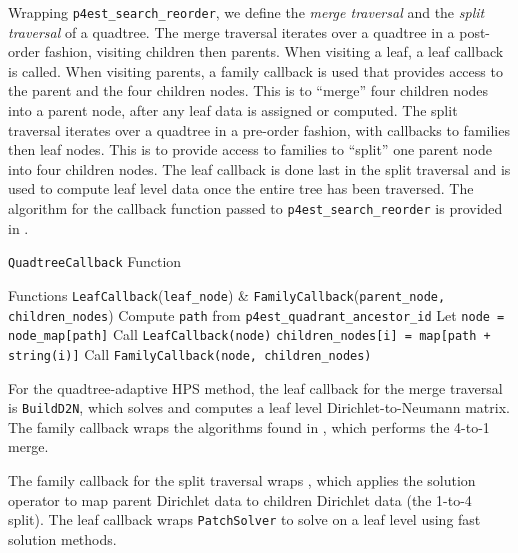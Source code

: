 Wrapping \texttt{p4est\_search\_reorder}, we define the {\em merge traversal} and the {\em split traversal} of a quadtree. The merge traversal iterates over a quadtree in a post-order fashion, visiting children then parents. When visiting a leaf, a leaf callback is called. When visiting parents, a family callback is used that provides access to the parent and the four children nodes. This is to ``merge'' four children nodes into a parent node, after any leaf data is assigned or computed. The split traversal iterates over a quadtree in a pre-order fashion, with callbacks to families then leaf nodes. This is to provide access to families to ``split'' one parent node into four children nodes. The leaf callback is done last in the split traversal and is used to compute leaf level data once the entire tree has been traversed. The algorithm for the callback function passed to \texttt{p4est\_search\_reorder} is provided in .

\begin{algorithm}
\caption{\texttt{QuadtreeCallback} Function}
\begin{algorithmic}[0]
    \Require Functions \texttt{LeafCallback}(\texttt{leaf\_node}) \& \texttt{FamilyCallback}(\texttt{parent\_node, children\_nodes})
    \State Compute \texttt{path} from \texttt{p4est\_quadrant\_ancestor\_id}
    \State Let \texttt{node = node\_map[path]}
     
        \State Call \texttt{LeafCallback(node)}
    \Else {}
            \State \texttt{children\_nodes[i] = map[path + string(i)]}
        \EndFor
        \State Call \texttt{FamilyCallback(node, children\_nodes)}
    \EndIf
\end{algorithmic}
\label{alg:quadtree_callback}
\end{algorithm}

For the quadtree-adaptive HPS method, the leaf callback for the merge traversal is \texttt{BuildD2N}, which solves  and computes a leaf level Dirichlet-to-Neumann matrix. The family callback wraps the algorithms found in , which performs the 4-to-1 merge.

The family callback for the split traversal wraps , which applies the solution operator to map parent Dirichlet data to children Dirichlet data (the 1-to-4 split). The leaf callback wraps \texttt{PatchSolver} to solve  on a leaf level using fast solution methods.